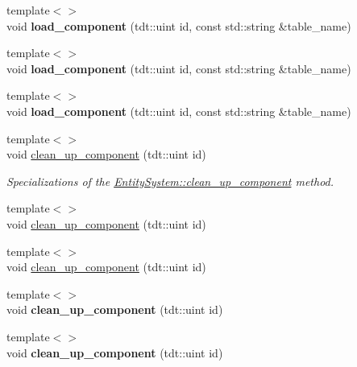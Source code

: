 \begin{DoxyCompactItemize}
\item 
{\footnotesize template$<$$>$ }\\void {\bfseries load\+\_\+component} (tdt\+::uint id, const std\+::string \&table\+\_\+name)\hypertarget{class_entity_system_ac8eead7736efd2ae728661f901142b27}{}\label{class_entity_system_ac8eead7736efd2ae728661f901142b27}

\item 
{\footnotesize template$<$$>$ }\\void {\bfseries load\+\_\+component} (tdt\+::uint id, const std\+::string \&table\+\_\+name)\hypertarget{class_entity_system_ac8eead7736efd2ae728661f901142b27}{}\label{class_entity_system_ac8eead7736efd2ae728661f901142b27}

\item 
{\footnotesize template$<$$>$ }\\void {\bfseries load\+\_\+component} (tdt\+::uint id, const std\+::string \&table\+\_\+name)\hypertarget{class_entity_system_ac8eead7736efd2ae728661f901142b27}{}\label{class_entity_system_ac8eead7736efd2ae728661f901142b27}

\item 
{\footnotesize template$<$$>$ }\\void \hyperlink{class_entity_system_a65dfc1efc2561a48999d82377cf22bfa}{clean\+\_\+up\+\_\+component} (tdt\+::uint id)
\begin{DoxyCompactList}\small\item\em Specializations of the \hyperlink{class_entity_system_abbe94182987541e7047ee1a8fa3388b7}{Entity\+System\+::clean\+\_\+up\+\_\+component} method. \end{DoxyCompactList}\item 
{\footnotesize template$<$$>$ }\\void \hyperlink{class_entity_system_a65dfc1efc2561a48999d82377cf22bfa}{clean\+\_\+up\+\_\+component} (tdt\+::uint id)
\item 
{\footnotesize template$<$$>$ }\\void \hyperlink{class_entity_system_a65dfc1efc2561a48999d82377cf22bfa}{clean\+\_\+up\+\_\+component} (tdt\+::uint id)
\item 
{\footnotesize template$<$$>$ }\\void {\bfseries clean\+\_\+up\+\_\+component} (tdt\+::uint id)\hypertarget{class_entity_system_a65dfc1efc2561a48999d82377cf22bfa}{}\label{class_entity_system_a65dfc1efc2561a48999d82377cf22bfa}

\item 
{\footnotesize template$<$$>$ }\\void {\bfseries clean\+\_\+up\+\_\+component} (tdt\+::uint id)\hypertarget{class_entity_system_a65dfc1efc2561a48999d82377cf22bfa}{}\label{class_entity_system_a65dfc1efc2561a48999d82377cf22bfa}


\end{DoxyCompactItemize}
